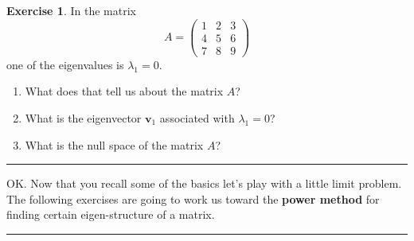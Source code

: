\documentclass[
]{book}
\providecommand{\tightlist}{%
  \setlength{\itemsep}{0pt}\setlength{\parskip}{0pt}}
\theoremstyle{definition}
\theoremstyle{definition}
\theoremstyle{definition}
\newtheorem{exercise}{Exercise}[chapter]
\theoremstyle{remark}
\begin{document}
\begin{exercise}
\protect\hypertarget{exr:unnamed-chunk-361}{}{\label{exr:unnamed-chunk-361} }In the matrix
\[ A = \begin{pmatrix} 1 & 2 & 3 \\ 4 & 5 & 6 \\ 7 & 8 & 9 \end{pmatrix} \]
one of the eigenvalues is \(\lambda_1 = 0\).

\begin{enumerate}
\def\labelenumi{\alph{enumi}.}
\tightlist
\item
  What does that tell us about the matrix \(A\)?
\item
  What is the eigenvector \(\boldsymbol{v}_1\) associated with \(\lambda_1 = 0\)?
\item
  What is the null space of the matrix \(A\)?
\end{enumerate}
\end{exercise}

\begin{center}\rule{0.5\linewidth}{0.5pt}\end{center}

OK. Now that you recall some of the basics let's play with a little limit problem. The following exercises are going to work us toward the \textbf{power method} for finding certain eigen-structure of a matrix.

\begin{center}\rule{0.5\linewidth}{0.5pt}\end{center}
\end{document}
